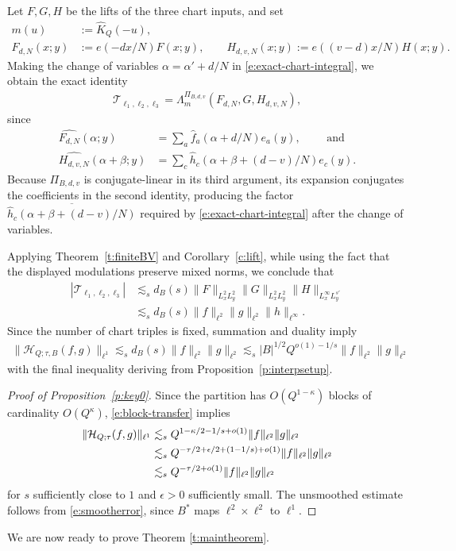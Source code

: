 \documentclass[12pt,leqno]{amsart}
\numberwithin{equation}{section}
\theoremstyle{definition}
\theoremstyle{plain}
\begin{document}
	Let $F,G,H$ be the lifts of the three chart inputs, and set
	\[
	\begin{aligned}
		m(u)&:=\widehat K_Q(-u),\\
		F_{d,N}(x;y)&:=e(-dx/N)F(x;y),\qquad
		H_{d,v,N}(x;y):=e((v-d)x/N)H(x;y).
	\end{aligned}
	\]
	Making the change of variables $\alpha=\alpha'+d/N$ in
	\eqref{e:exact-chart-integral}, we obtain the exact identity
	\begin{align}\label{e:chart-identification}
		\mathcal T_{\ell_1,\ell_2,\ell_3}
		=\Lambda_m^{\Pi_{B,d,v}}(F_{d,N},G,H_{d,v,N}),
	\end{align}
	since
	\[
	\begin{aligned}
		\widehat{F_{d,N}}(\alpha;y)
		&=\sum_a\widehat f_a(\alpha+d/N)e_a(y), \qquad \text{ and} \\
		\widehat{H_{d,v,N}}(\alpha+\beta;y)
		&=\sum_c\widehat h_c(\alpha+\beta+(d-v)/N)e_c(y).
	\end{aligned}
	\]
	Because $\Pi_{B,d,v}$ is conjugate-linear in its third argument, its
	expansion conjugates the coefficients in the second identity, producing
	the factor $\overline{\widehat h_c(\alpha+\beta+(d-v)/N)}$ required by
	\eqref{e:exact-chart-integral} after the change of variables.
	
	
	Applying Theorem~\ref{t:finiteBV} and Corollary~\ref{c:lift}, while
	using the fact that the displayed modulations preserve mixed norms,
	we conclude that
	\begin{align*}
		|\mathcal T_{\ell_1,\ell_2,\ell_3}|
		&\lesssim_s d_B(s)
		\|F\|_{L_x^2L_y^2}\|G\|_{L_x^2L_y^2}
		\|H\|_{L_x^\infty L_y^{s'}}\\
		&\lesssim_s d_B(s)\|f\|_{\ell^2}\|g\|_{\ell^2}\|h\|_{\ell^\infty}.
	\end{align*}
	Since the number of chart triples is fixed, summation and duality imply
	\begin{align}\label{e:block-transfer}
		\|\mathcal H_{Q;\tau,B}(f,g)\|_{\ell^1}
		\lesssim_s d_B(s)\|f\|_{\ell^2}\|g\|_{\ell^2} \lesssim_s |B|^{1/2} Q^{o(1)-1/s} \|f\|_{\ell^2}\|g\|_{\ell^2} 
	\end{align}
	with the final inequality deriving from Proposition~\ref{p:interpsetup}.

	
	\begin{proof}[Proof of Proposition~\ref{p:key0}]
		Since the partition has $O(Q^{1-\kappa})$ blocks of cardinality
		$O(Q^\kappa)$, \eqref{e:block-transfer} implies
		\begin{align}\label{e:Q-saving}
			\|\mathcal H_{Q;\tau}(f,g)\|_{\ell^1}
			&\lesssim_s Q^{1-\kappa/2-1/s+o(1)}
			\|f\|_{\ell^2}\|g\|_{\ell^2}\notag\\
			&\lesssim_s Q^{-\tau/2+\epsilon/2+(1-1/s)+o(1)}
			\|f\|_{\ell^2}\|g\|_{\ell^2} \\
			& \lesssim_s Q^{-\tau/2+o(1)} \|f\|_{\ell^2}\|g\|_{\ell^2}
		\end{align}
		for $s$ sufficiently close to $1$ and $\epsilon >0$ sufficiently small.
		The unsmoothed estimate follows from \eqref{e:smootherror}, since
		$B^*$ maps $\ell^2\times\ell^2$ to $\ell^1$.
	\end{proof}
	We are now ready to prove Theorem \ref{t:maintheorem}.
\end{document}
